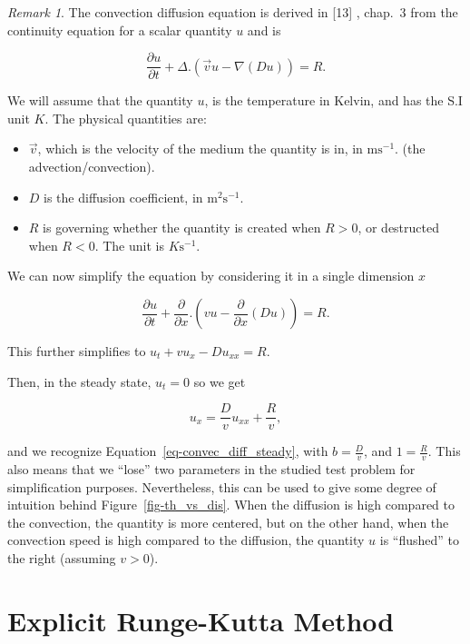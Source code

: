 \documentclass[
  letterpaper,
]{report}
\providecommand{\tightlist}{%
  \setlength{\itemsep}{0pt}\setlength{\parskip}{0pt}}\usepackage{longtable,booktabs,array}
\theoremstyle{definition}
\theoremstyle{plain}
\theoremstyle{definition}
\theoremstyle{remark}
\newtheorem*{remark}{Remark}
\begin{document}
\begin{remark}
The convection diffusion equation is derived in {[}13{]} , chap.~3 from
the continuity equation for a scalar quantity \(u\) and is

\[
\frac{\partial u}{\partial t} + \Delta.(\vec{v}u - \nabla(Du)) = R.
\]

We will assume that the quantity \(u\), is the temperature in Kelvin,
and has the S.I unit \(K\). The physical quantities are:

\begin{itemize}
\tightlist
\item
  \(\vec{v}\), which is the velocity of the medium the quantity is in,
  in \(\text{ms}^{-1}\). (the advection/convection).
\item
  \(D\) is the diffusion coefficient, in \(\text{m}^2\text{s}^{-1}\).
\item
  \(R\) is governing whether the quantity is created when \(R>0\), or
  destructed when \(R<0\). The unit is \(K\text{s}^{-1}\).
\end{itemize}

We can now simplify the equation by considering it in a single dimension
\(x\)

\[
\frac{\partial u}{\partial t} + \frac{\partial}{\partial x}.(vu - \frac{\partial}{\partial x}(Du)) = R.
\]

This further simplifies to \(u_t + vu_x - Du_{xx} = R\).

Then, in the steady state, \(u_t = 0\) so we get

\[
u_x = \frac{D}{v}u_{xx} + \frac{R}{v},
\]

and we recognize Equation~\ref{eq-convec_diff_steady}, with
\(b = \frac{D}{v}\), and \(1 = \frac{R}{v}\). This also means that we
``lose'' two parameters in the studied test problem for simplification
purposes. Nevertheless, this can be used to give some degree of
intuition behind Figure~\ref{fig-th_vs_dis}. When the diffusion is high
compared to the convection, the quantity is more centered, but on the
other hand, when the convection speed is high compared to the diffusion,
the quantity \(u\) is ``flushed'' to the right (assuming \(v>0\)).
\end{remark}


\chapter{Explicit Runge-Kutta Method}\label{explicit-runge-kutta-method}
\end{document}
